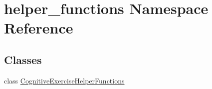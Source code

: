 \hypertarget{namespacehelper__functions}{\section{helper\-\_\-functions Namespace Reference}
\label{namespacehelper__functions}
}
\subsection*{Classes}
\begin{DoxyCompactItemize}
\item 
class \hyperlink{classhelper__functions_1_1CognitiveExerciseHelperFunctions}{Cognitive\-Exercise\-Helper\-Functions}
\end{DoxyCompactItemize}
